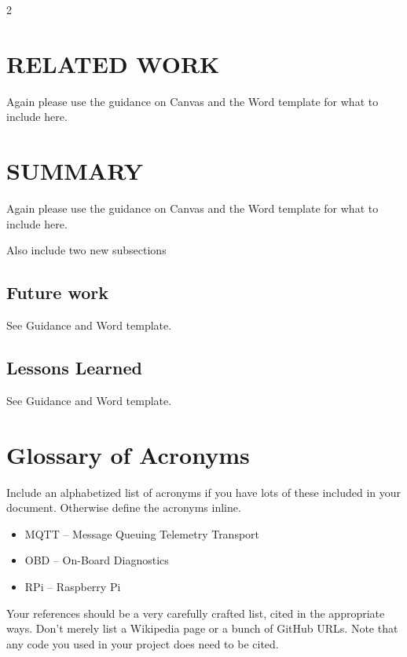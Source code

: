 \documentclass[10pt]{article}
\begin{document}
\begin{multicols*}{2}
\section{RELATED WORK} \label{related-work}
Again please use the guidance on Canvas and the Word template for what to include here.

\section{SUMMARY} \label{summary}
Again please use the guidance on Canvas and the Word template for what to include here.
{\color{red}
Also include two new subsections
\subsection{Future work}
See Guidance and Word template.

\subsection{Lessons Learned}
See Guidance and Word template.
}

\section*{Glossary of Acronyms}
Include an alphabetized list of acronyms if you have lots of these included in your document. Otherwise define the acronyms inline.
\begin{itemize}
    \item MQTT – Message Queuing Telemetry Transport
    \item OBD – On-Board Diagnostics
    \item RPi – Raspberry Pi 
\end{itemize}

\printbibliography
Your references should be a very carefully crafted list, cited in the appropriate ways.  Don't merely list a Wikipedia page or a bunch of GitHub URLs.  Note that any code you used in your project does need to be cited.
\\


\end{multicols*}
\end{document}
